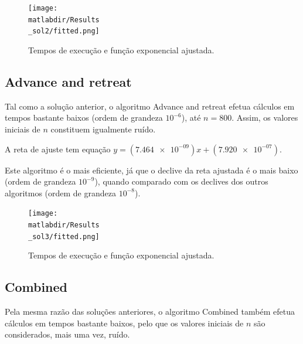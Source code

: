 \documentclass[portuguese,11pt,a4paper,titlepage]{article}
\newcommand{\matlabdir}{"../MATLAB-fittings"}
\begin{document}
\begin{figure}[h]
	\centering
	\texttt{[image: \\matlabdir/Results\\\_sol2/fitted.png]}
	\caption{Tempos de execução e função exponencial ajustada.}
	\label{fig:sol2}
\end{figure}
\pagebreak

\subsection{Advance and retreat}
Tal como a solução anterior, o algoritmo Advance and retreat efetua cálculos em tempos bastante baixos
(ordem de grandeza \begin{math}10^{-6}\end{math}), até \begin{math}n = 800\end{math}.
Assim, os valores iniciais de \begin{math}n\end{math} constituem igualmente ruído.

A reta de ajuste tem equação \begin{math}y=(\num{7.464e-09})x+(\num{7.920e-07})\end{math}.

Este algoritmo é o mais eficiente, já que o declive da reta ajustada é o mais baixo
(ordem de grandeza \begin{math}10^{-9}\end{math}), quando comparado com os
declives dos outros algoritmos (ordem de grandeza \begin{math}10^{-8}\end{math}).

\begin{figure}[h]
	\centering
	\texttt{[image: \\matlabdir/Results\\\_sol3/fitted.png]}
	\caption{Tempos de execução e função exponencial ajustada.}
	\label{fig:sol3}
\end{figure}

\subsection{Combined}
Pela mesma razão das soluções anteriores, o algoritmo Combined também efetua cálculos em tempos bastante
baixos, pelo que os valores iniciais de \begin{math}n\end{math} são considerados, mais uma vez, ruído.
\end{document}
